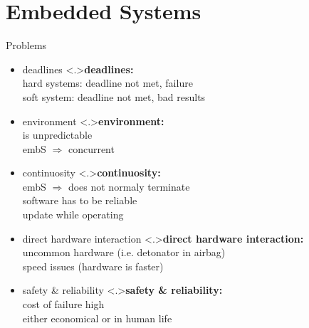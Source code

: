 \documentclass[ngerman={babel}, utf8, bigger, xcolor={table,dvipsnames}, ompress, hyperref={bookmarks,colorlinks}]{beamer}
\begin{document}
\section{Embedded Systems}
\begin{frame}{Problems}
	\begin{itemize}
		\item deadlines
		\note<.>{\textbf{deadlines:}\\ hard systems: deadline not met, failure\\ soft system: deadline not met, bad results}
		\item environment
		\note<.>{\textbf{environment:}\\ is unpredictable \\ embS $\Rightarrow$ concurrent}
		\item continuosity
		\note<.>{\textbf{continuosity:}\\ embS $\Rightarrow$ does not normaly terminate \\ software has to be reliable \\ update while operating}
		\item direct hardware interaction
		\note<.>{\textbf{direct hardware interaction:}\\ uncommon hardware (i.e. detonator in airbag) \\ speed issues (hardware is faster)}
		\item safety \& reliability
		\note<.>{\textbf{safety \& reliability:}\\ cost of failure high \\ either economical or in human life}
	\end{itemize}
\end{frame}
\end{document}

